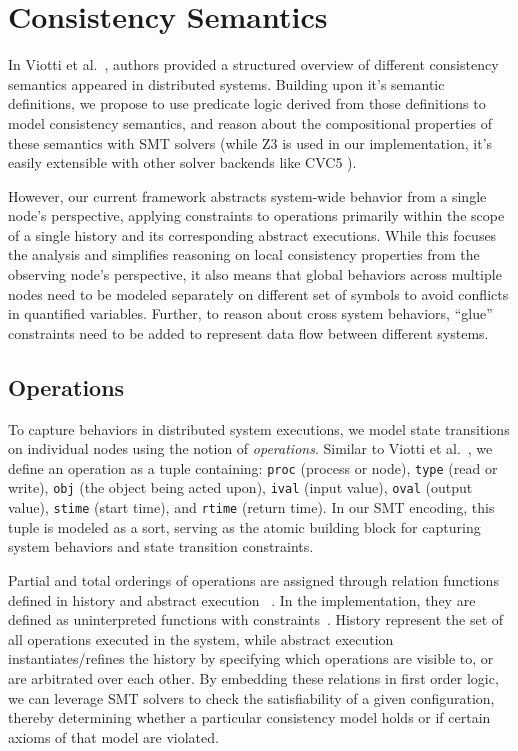 \section{Consistency Semantics}

In Viotti et al.~\cite{viotti2016consistency}, authors provided a structured overview
of different consistency semantics appeared in distributed systems. Building
upon it's semantic definitions, we propose to use predicate logic derived from
those definitions to model consistency semantics, and reason about the
compositional properties of these semantics with SMT solvers (while Z3
\cite{demoura2008z3} is used in our implementation, it's easily extensible with other
solver backends like CVC5 \cite{barbosa2022cvc5}).


However, our current framework abstracts system-wide behavior from a single
node's perspective, applying constraints to operations primarily within the
scope of a single history and its corresponding abstract executions. While this
focuses the analysis and simplifies reasoning on local consistency properties
from the observing node's perspective, it also means that global behaviors
across multiple nodes need to be modeled separately on different set of symbols
to avoid conflicts in quantified variables. Further, to reason about cross
system behaviors, ``glue'' constraints need to be added to represent data flow
between different systems.

\subsection{Operations}

To capture behaviors in distributed system executions, we model state
transitions on individual nodes using the notion of \textit{operations}. Similar to
Viotti et al.~\cite{viotti2016consistency}, we define an operation as a tuple
containing: \texttt{proc} (process or node), \texttt{type} (read or write), \texttt{obj} (the object
being acted upon), \texttt{ival} (input value), \texttt{oval} (output value), \texttt{stime}
(start time), and \texttt{rtime} (return time). In our SMT encoding, this tuple is
modeled as a sort, serving as the atomic building block for capturing system
behaviors and state transition constraints.

Partial and total orderings of operations are assigned through relation
functions defined in history and abstract execution~\cite{burckhardt2014principles}
\cite{viotti2016consistency}. In the implementation, they are defined as uninterpreted
functions with constraints~\cite{bryant2002modeling}. History represent the set of all
operations executed in the system, while abstract execution instantiates/refines
the history by specifying which operations are visible to, or are arbitrated
over each other. By embedding these relations in first order logic, we can
leverage SMT solvers to check the satisfiability of a given configuration,
thereby determining whether a particular consistency model holds or if certain
axioms of that model are violated.

